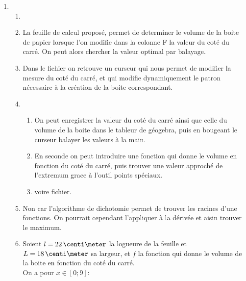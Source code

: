 \begin{enumerate}[label=\textbf{\color{red}\arabic*. \color{black}situation \arabic*}, wide, labelwidth=!, labelindent=0pt]
    \item
    \begin{enumerate}[label=\textbf{\color{red}\alph*.}]
        \item {}
        \item La feuille de calcul proposé,
        permet de determiner le volume de la boite de papier lorsque l'on modifie dans la colonne F la valeur du coté du carré.
        On peut alors chercher la valeur optimal par balayage.
        \item Dans le fichier on retrouve un curseur qui nous permet de modifier la mesure du coté du carré,
        et qui modifie dynamiquement le patron nécessaire à la création de la boite correspondant.
        \item \begin{enumerate}[label=\textbf{\color{red}\roman*.}]
            \item On peut enregistrer la valeur du coté du carré ainsi que celle du volume de la boite dans le tableur de géogebra,
            puis en bougeant le curseur balayer les valeurs à la main.
            \item En seconde on peut introduire une fonction qui donne le volume en fonction du coté du carré,
            puis trouver une valeur approché de l'extremum grace à l'outil points spéciaux.
            \item voire fichier.
        \end{enumerate}
        \item Non car l'algorithme de dichotomie permet de trouver les racines d'une fonctions.
        On pourrait cependant l'appliquer à la dérivée et aisin trouver le maximum.
        \item Soient $l = 22\cm$ la logueure de la feuille et $L = 18\cm$ sa largeur,
        et $f$ la fonction qui donne le volume de la boite en fonction du coté du carré.\\
        On a pour $x\in[0;9]$: 

\end{enumerate}
\end{enumerate}
